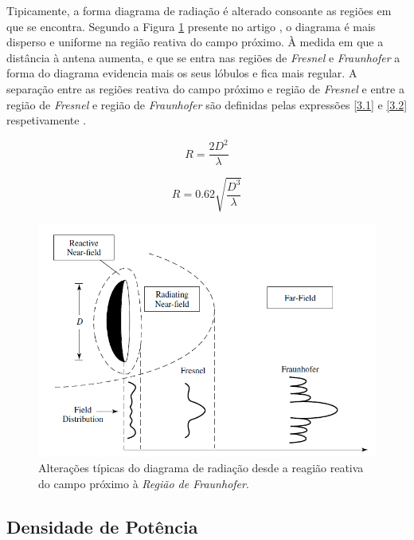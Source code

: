 Tipicamente, a forma diagrama de radiação é alterado consoante as regiões em que se encontra. Segundo a Figura \ref{fig:alt_tipicas_regioes} presente no artigo \cite{Y.RahmatL.WilliamsR.Yoccarino1995}, o diagrama é mais disperso e uniforme na região reativa do campo próximo. À medida em que a distância à antena aumenta, e que se entra nas regiões de \textit{Fresnel} e \textit{Fraunhofer} a forma do diagrama evidencia mais os seus lóbulos e fica mais regular. A separação entre as regiões reativa do campo próximo e região de \textit{Fresnel} e entre a região de \textit{Fresnel} e região de \textit{Fraunhofer} são definidas pelas expressões \ref{3.1} e \ref{3.2} respetivamente \parencite{Y.RahmatL.WilliamsR.Yoccarino1995}.

\begin{equation} \label{3.1}
R=\dfrac{2D^{2}}{\lambda}
\end{equation}

\begin{equation} \label{3.2}
R=0.62\sqrt{\dfrac{D^{3}}{\lambda}}
\end{equation}

\begin{figure}[h]
\centering
\includegraphics[scale=0.6]{chapters/ch3/assets/alt_tipicas_regioes}
\decoRule
\caption[Alterações típicas da forma do diagrama de radiação]{Alterações típicas do diagrama de radiação desde a reagião reativa do campo próximo à \textit{Região de Fraunhofer}. \parencite{Y.RahmatL.WilliamsR.Yoccarino1995}}
\label{fig:alt_tipicas_regioes}
\end{figure}


\subsection*{Densidade de Potência}

